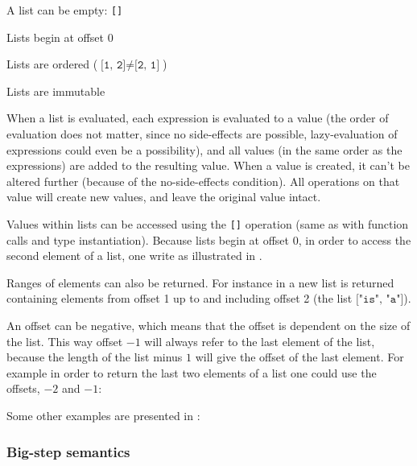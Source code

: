 \begin{nlist}
\item A list can be empty: \texttt{[]}
\item Lists begin at offset $0$
\item Lists are ordered ($\texttt{[1, 2]} \ne \texttt{[2, 1]}$)
\item Lists are immutable
\end{nlist}

When a list is evaluated, each expression is evaluated to a value (the order of
evaluation does not matter, since no side-effects are possible, lazy-evaluation
of expressions could even be a possibility), and all values (in the same order
as the expressions) are added to the resulting  value. When a
 value is created, it can't be altered further (because of the
no-side-effects condition). All operations on that  value will create
new  values, and leave the original value intact.

Values within lists can be accessed using the \texttt{[]} operation (same as
with function calls and type instantiation). Because lists begin at offset $0$, in
order to access the second element of a list, one write as illustrated in
.


Ranges of elements can also be returned. For instance in
 a new list is returned containing elements from offset 1 up
to and including offset 2 (the list $\texttt{["is", "a"]}$).


An offset can be negative, which means that the offset is dependent on
the size of the list. This way offset $-1$ will always refer to the last element
of the list, because the length of the list minus $1$ will give the offset of
the last element. For example in order to return the last two elements of a list one
could use the offsets, $-2$ and $-1$:


Some other examples are presented in :


\subsubsection{Big-step semantics}

